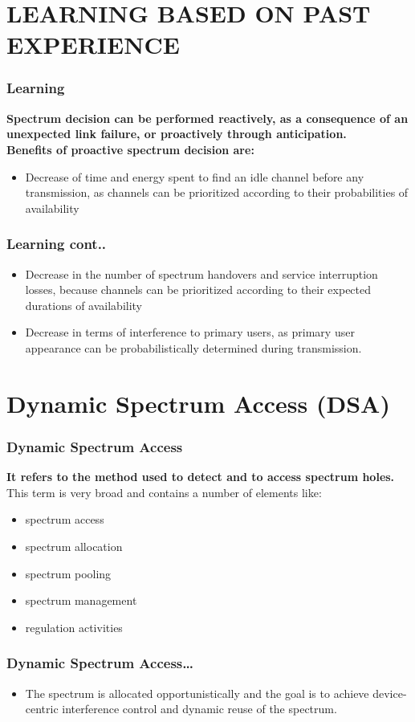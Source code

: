 \documentclass{beamer}
\begin{document}
\section{LEARNING BASED ON PAST EXPERIENCE}
\begin{frame}
\frametitle{Learning}
\textbf{Spectrum decision can be performed reactively, as a consequence of an unexpected link failure, or proactively through anticipation.}\\

\textbf{Benefits of proactive spectrum decision are: }\\
\begin{itemize}
\item Decrease of time and energy spent to find an idle channel before any transmission, as channels can be prioritized according to their probabilities of availability 
\end{itemize}
\end{frame}

\begin{frame}
\frametitle{Learning cont..}
\begin{itemize}
\item Decrease in the number of spectrum handovers and service interruption losses, because channels can be prioritized according to their expected durations of availability
\item Decrease in terms of interference to primary users, as primary user appearance can be probabilistically determined during transmission.
\end{itemize}
\end{frame}

\section{Dynamic Spectrum Access (DSA)}
\begin{frame}
\frametitle{Dynamic Spectrum Access}

\textbf{It refers to the method used to detect and to access spectrum holes.}\\
This term is very broad and contains a number of elements like:
\begin{itemize}
\item spectrum access
\item spectrum allocation
\item spectrum pooling
\item spectrum management
\item regulation activities
\end{itemize}
\end{frame}
\begin{frame}
\frametitle{Dynamic Spectrum Access\dots}
\begin{itemize}
\item The spectrum is allocated opportunistically and the goal is to achieve device-centric interference control and dynamic reuse of the spectrum.

\end{itemize}
\end{frame}
\end{document}
